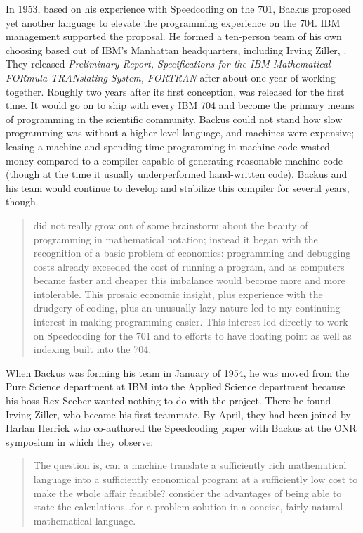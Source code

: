 In 1953, based on his experience with Speedcoding on the 701, Backus proposed
yet another language to elevate the programming experience on the 704. IBM
management supported the proposal. He formed a ten-person team of his own
choosing based out of IBM's Manhattan headquarters, including Irving Ziller,
. They released \textit{Preliminary Report,
  Specifications for the IBM Mathematical FORmula TRANslating System,
FORTRAN}\cite{IBM_1954_FORTRAN_Specifications} after about one year of working
together. Roughly two years after its first conception, \FTN{} was released for
the first time. It would go on to ship with every IBM 704 and become the
primary means of programming in the scientific community. Backus could not
stand how slow programming was without a higher-level language, and machines
were expensive; leasing a machine and spending time programming in machine code
wasted money compared to a compiler capable of generating reasonable machine
code (though at the time it usually underperformed hand-written code). Backus
and his team would continue to develop and stabilize this compiler for several
years, though.

\begin{quotation}
  \FTN{} did not really grow out of some brainstorm about the beauty of
  programming in mathematical notation; instead it began with the recognition
  of a basic problem of economics: programming and debugging costs already
  exceeded the cost of running a program, and as computers became faster
  and cheaper this imbalance would become more and more intolerable. This
  prosaic economic insight, plus experience with the drudgery of coding, plus
  an unusually lazy nature led to my continuing interest in making
  programming easier.
  This interest led directly to work on Speedcoding for the 701
  and to efforts to have floating point as well as indexing built into the 704.
  \cite{Backus_1980_Programming_in_America_in_1950s}
\end{quotation}

When Backus was forming his team in January of 1954, he was moved from the Pure
Science department at IBM into the Applied Science department because his boss
Rex Seeber wanted nothing to do with the project. There he found Irving Ziller,
who became his first teammate. By April, they had been joined by Harlan Herrick
who co-authored the Speedcoding paper with Backus at the ONR symposium
 in which they observe:

\begin{quotation}
  The question is, can a machine translate a sufficiently rich mathematical
  language into a sufficiently economical program at a sufficiently low cost to
  make the whole affair feasible?  consider the advantages of being
  able to state
  the calculations\dots for a problem solution in a concise, fairly natural
  mathematical language.
\end{quotation}

